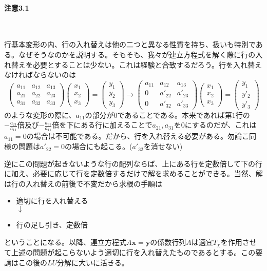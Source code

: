 \documentclass[dvipdfmx]{jsarticle}
\begin{document}
\paragraph{注意3.1}\par~\par
行基本変形の内、行の入れ替えは他の二つと異なる性質を持ち、扱いも特別である。なぜそうなのかを説明する。そもそも、我々が連立方程式を解く際に行の入れ替えを必要とすることは少ない。これは経験と合致するだろう。行を入れ替えなければならないのは
\[\begin{pmatrix}a_{11}&a_{12}&a_{13}\\a_{21}&a_{22}&a_{23}\\a_{31}&a_{32}&a_{33}\end{pmatrix}\begin{pmatrix}x_1\\x_2\\x_3\end{pmatrix}=\begin{pmatrix}y_1\\y_2\\y_3\end{pmatrix}\to\begin{pmatrix}a_{11}&a_{12}&a_{13}\\0&a'_{22}&a'_{23}\\0&a'_{32}&a'_{33}\end{pmatrix}\begin{pmatrix}x_1\\x_2\\x_3\end{pmatrix}=\begin{pmatrix}y_1\\y'_2\\y'_3\end{pmatrix}\]
のような変形の際に、$a_{11}$の部分が$0$であることである。本来であれば第$1$行の$-\displaystyle\frac{a_{21}}{a_{11}}$倍及び$-\displaystyle\frac{a_{31}}{a_{11}}$倍を下にある行に加えることで$a_{21},a_{31}$を$0$にするのだが、これは$a_{11}=0$の場合は不可能である。だから、行を入れ替える必要がある。勿論こ同様の問題は$a'_{22}=0$の場合にも起こる。($a'_{32}$を消せない)\par
逆にこの問題が起きないような行の配列ならば、上にある行を定数倍して下の行に加え、必要に応じて行を定数倍するだけで解を求めることができる。当然、解は行の入れ替えの前後で不変だから求根の手順は
\begin{itemize}
\item 適切に行を入れ替える\\
\hspace{5em}$\downarrow$
\item 行の足し引き、定数倍
\end{itemize}
ということになる。以降、連立方程式$A\bm{x}=\bm{y}$の係数行列$A$は適宜$T_\chi$を作用させて上述の問題が起こらないよう適切に行を入れ替えたものであるとする。この要請はこの後の$LU$分解に大いに活きる。

\end{document}
